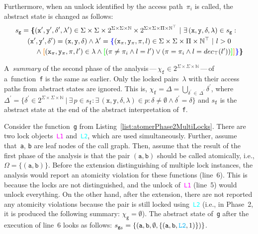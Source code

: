 Furthermore, when an unlock identified by the access path~$ \pi_i $ is called, the abstract state is changed as follows:
$$
\begin{multlined}
    s_\mathtt{g} = \bb{\{}(\mathtt{x}^\prime, \mathtt{y}^\prime, \delta^\prime, \lambda^\prime) \in \Sigma \times \Sigma \times 2^{\Sigma \times \Sigma \times \mathbb{N}} \times 2^{\Sigma \times \Sigma \times \Pi \times \mathbb{N}^\top}\ |\ \exists\,(\mathtt{x}, \mathtt{y}, \delta, \lambda) \in s_\mathtt{g} : \\
%
    (\mathtt{x}^\prime, \mathtt{y}^\prime, \delta^\prime) = (\mathtt{x}, \mathtt{y}, \delta) \wedge \lambda^\prime = \bA{\{}(\mathtt{x}_\pi, \mathtt{y}_\pi, \pi, l) \in \Sigma \times \Sigma \times \Pi \times \mathbb{N}^\top\ |\ l > 0 \\
%
    \wedge \bB{[}(\mathtt{x}_\pi, \mathtt{y}_\pi, \pi, l^\prime) \in \lambda \wedge \bD{[}(\pi \neq \pi_i \wedge l = l^\prime) \vee (\pi = \pi_i \wedge l = dec_\top(l^\prime))
%
    \bD{]}\bB{]}\bA{\}}\bb{\}}
\end{multlined}
$$

A~\emph{summary} of the second phase of the analysis\,---\,$ \chi_\mathtt{f} \in 2^{\Sigma \times \Sigma \times \mathbb{N}} $\,---\,of a~function~\texttt{f} is the same as earlier. Only the locked pairs~$ \lambda $ with their access paths from abstract states are ignored. This is, $ \chi_\mathtt{f} = \Delta = \bigcup_{\delta^\prime\,\in\,\Delta^\prime} \delta^\prime $, where $ \Delta^\prime = \{\delta^\prime \in 2^{\Sigma \times \Sigma \times \mathbb{N}}\ |\ \exists\,p \in s_\mathtt{f} : \exists\,(\mathtt{x}, \mathtt{y}, \delta, \lambda) \in p : \delta \neq \emptyset \wedge \delta^\prime = \delta\} $ and $ s_\mathtt{f} $ is the abstract state at the end of the abstract interpretation of~\texttt{f}.

\begin{example}
    Consider the function~\texttt{g} from Listing~\ref{list:atomerPhase2MultiLocks}. There are two lock objects~\textcolor{magenta}{\texttt{L1}} and~\textcolor{cyan}{\texttt{L2}}, which are used simultaneously. Further, assume that~\texttt{a}, \texttt{b} are leaf nodes of the call graph. Then, assume that the result of the first phase of the analysis is that the pair $ (\mathtt{a}, \mathtt{b}) $ should be called atomically, i.e., $ \Omega = \{(\mathtt{a}, \mathtt{b})\} $. Before the extension distinguishing of multiple lock instances, the analysis would report an atomicity violation for these functions (line~6). This is because the locks are not distinguished, and the unlock of~\textcolor{magenta}{\texttt{L1}} (line~5) would unlock everything. On the other hand, after the extension, there are not reported any atomicity violations because the pair is still locked using~\textcolor{cyan}{\texttt{L2}} (i.e., in Phase~2, it is produced the following summary: $ \chi_\mathtt{g} = \emptyset $). The abstract state of~\texttt{g} after the execution of line~6 looks as follows: $ s_{\mathtt{g}_6} = \{(\mathtt{a}, \mathtt{b}, \emptyset, \{(\mathtt{a}, \mathtt{b}, \textcolor{cyan}{\mathtt{L2}}, 1)\})\} $.
\end{example}

